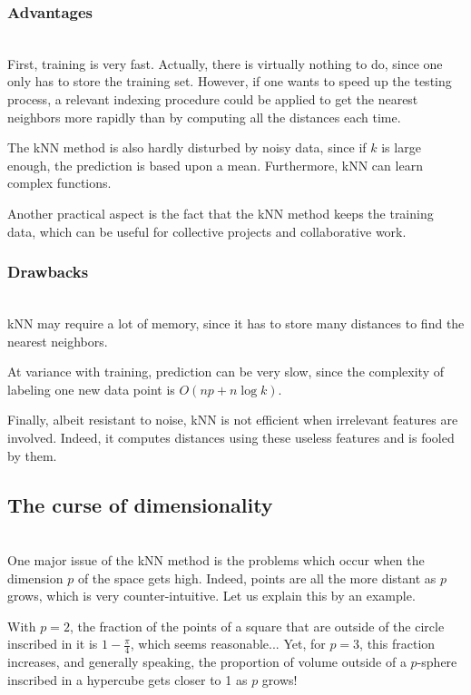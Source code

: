 \documentclass[a4paper,12pt]{article}
\begin{document}
\subsubsection{Advantages}\\

First, training is very fast. Actually, there is virtually nothing to do, since one only has to store the training set. However, if one wants to speed up the testing process, a relevant indexing procedure could be applied to get the nearest neighbors more rapidly than by computing all the distances each time.

The kNN method is also hardly disturbed by noisy data, since if $k$ is large enough, the prediction is based upon a mean. Furthermore, kNN can learn complex functions.

Another practical aspect is the fact that the kNN method keeps the training data, which can be useful for collective projects and collaborative work.

\subsubsection{Drawbacks}\\

kNN may require a lot of memory, since it has to store many distances to find the nearest neighbors. 

At variance with training, prediction can be very slow, since the complexity of labeling one new data point is $O(np+n \log k)$.

Finally, albeit resistant to noise, kNN is not efficient when irrelevant features are involved. Indeed, it computes distances using these useless features and is fooled by them.

\subsection{The curse of dimensionality}\\
One major issue of the kNN method is the problems which occur when the dimension $p$ of the space gets high. Indeed, points are all the more distant as $p$ grows, which is very counter-intuitive. Let us explain this by an example.

With $p=2$, the fraction of the points of a square that are outside of the circle inscribed in it is $1-\frac{\pi}{4}$, which seems reasonable... Yet, for $p=3$, this fraction increases, and generally speaking, the proportion of volume outside of a $p$-sphere inscribed in a hypercube gets closer to 1 as $p$ grows!
\end{document}
